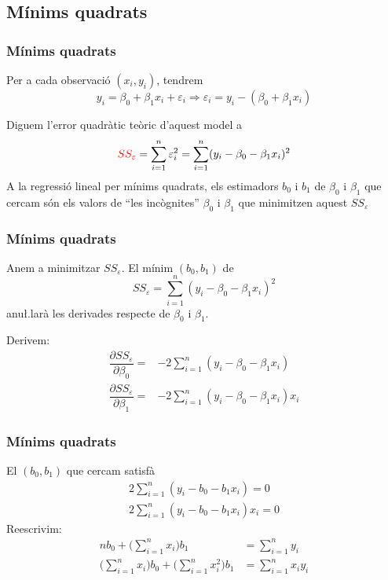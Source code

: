 \documentclass[12pt,t]{beamer}
\newcommand{\red}[1]{\textcolor{red}{#1}}
\renewcommand{\emph}[1]{{\color{red}#1}}
\theoremstyle{plain}
\theoremstyle{definition}
\begin{document}
\subsection{Mínims quadrats}

\begin{frame}
\frametitle{Mínims quadrats}

Per a cada observació $(x_i,y_i)$, tendrem
$$
y_i=\beta_0+\beta_1 x_i+ \varepsilon_i\Rightarrow \varepsilon_i=y_i-(\beta_0+\beta_1 x_i)
$$
\smallskip

Diguem l'\emph{error quadràtic teòric} d'aquest model a
$$
\red{SS_\varepsilon}=\sum_{i=1}^n \varepsilon_i^2=\sum_{i=1}^n (y_i-\beta_0-\beta_1 x_i)^2
$$
A la \emph{regressió lineal per mínims quadrats}, els estimadors $b_0$ i $b_1$ de $\beta_0$ i $\beta_1$ que cercam són els valors de ``les incògnites''  $\beta_0$ i $\beta_1$ que minimitzen aquest  $SS_\varepsilon$
\end{frame}

\begin{frame}
\frametitle{Mínims quadrats}
Anem a minimitzar $SS_\varepsilon$. El mínim $(b_0,b_1)$ de
$$
SS_\varepsilon=\sum_{i=1}^n (y_i-\beta_0-\beta_1 x_i)^2
$$
anu\l.larà les derivades respecte de $\beta_0$ i $\beta_1$.
\medskip

Derivem:
$$
\begin{array}{ll}
\dfrac{\partial SS_\varepsilon}{\partial \beta_0}=&-2\sum\limits_{i=1}^n (y_i -\beta_0-\beta_1 x_i)\\[2ex]
\dfrac{\partial SS_\varepsilon}{\partial \beta_1}=&-2\sum\limits_{i=1}^n (y_i -\beta_0-\beta_1 x_i) x_i 
\end{array}
$$
\end{frame}

\begin{frame}
\frametitle{Mínims quadrats}
El $(b_0,b_1)$ que cercam satisfà
$$
\begin{array}{l}
2\sum\limits_{i=1}^n (y_i -b_0-b_1 x_i)=0\\[2ex]
2\sum\limits_{i=1}^n (y_i -b_0-b_1 x_i) x_i =0
\end{array}
$$
Reescrivim:
$$
\begin{array}{rl}
n b_0 + \Big(\sum\limits_{i=1}^n x_i\Big) b_1 & =\sum\limits_{i=1}^n y_i\\[1ex]
\Big(\sum\limits_{i=1}^n x_i\Big) b_0 + \Big(\sum\limits_{i=1}^n x_i^2\Big) b_1 &=\sum\limits_{i=1}^n x_iy_i
\end{array}
$$
\end{frame}
\end{document}
